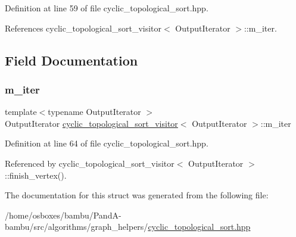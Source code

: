Definition at line 59 of file cyclic\+\_\+topological\+\_\+sort.\+hpp.



References cyclic\+\_\+topological\+\_\+sort\+\_\+visitor$<$ Output\+Iterator $>$\+::m\+\_\+iter.



\subsection{Field Documentation}
\mbox{\label{structcyclic__topological__sort__visitor_a3ca56c98de4016813491390a6845b35d}} 
\subsubsection{\texorpdfstring{m\+\_\+iter}{m\_iter}}
{\footnotesize\ttfamily template$<$typename Output\+Iterator $>$ \\
Output\+Iterator \hyperlink{structcyclic__topological__sort__visitor}{cyclic\+\_\+topological\+\_\+sort\+\_\+visitor}$<$ Output\+Iterator $>$\+::m\+\_\+iter}



Definition at line 64 of file cyclic\+\_\+topological\+\_\+sort.\+hpp.



Referenced by cyclic\+\_\+topological\+\_\+sort\+\_\+visitor$<$ Output\+Iterator $>$\+::finish\+\_\+vertex().



The documentation for this struct was generated from the following file\+:\begin{DoxyCompactItemize}
\item 
/home/osboxes/bambu/\+Pand\+A-\/bambu/src/algorithms/graph\+\_\+helpers/\hyperlink{cyclic__topological__sort_8hpp}{cyclic\+\_\+topological\+\_\+sort.\+hpp}\end{DoxyCompactItemize}
